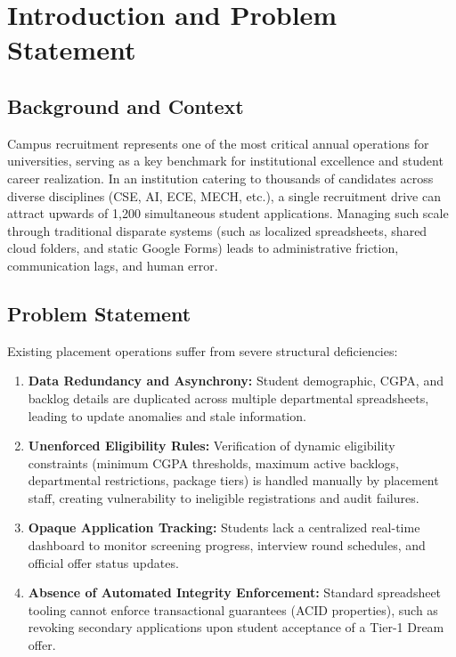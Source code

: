 \documentclass[11pt,a4paper]{article}
\begin{document}
\section{Introduction and Problem Statement}
\label{sec:intro_problem}

\subsection{Background and Context}
Campus recruitment represents one of the most critical annual operations for universities, serving as a key benchmark for institutional excellence and student career realization. In an institution catering to thousands of candidates across diverse disciplines (CSE, AI, ECE, MECH, etc.), a single recruitment drive can attract upwards of 1,200 simultaneous student applications. Managing such scale through traditional disparate systems (such as localized spreadsheets, shared cloud folders, and static Google Forms) leads to administrative friction, communication lags, and human error.

\subsection{Problem Statement}
Existing placement operations suffer from severe structural deficiencies:
\begin{enumerate}[label=\textbf{(\alph*)}]
    \item \textbf{Data Redundancy and Asynchrony:} Student demographic, CGPA, and backlog details are duplicated across multiple departmental spreadsheets, leading to update anomalies and stale information.
    \item \textbf{Unenforced Eligibility Rules:} Verification of dynamic eligibility constraints (minimum CGPA thresholds, maximum active backlogs, departmental restrictions, package tiers) is handled manually by placement staff, creating vulnerability to ineligible registrations and audit failures.
    \item \textbf{Opaque Application Tracking:} Students lack a centralized real-time dashboard to monitor screening progress, interview round schedules, and official offer status updates.
    \item \textbf{Absence of Automated Integrity Enforcement:} Standard spreadsheet tooling cannot enforce transactional guarantees (ACID properties), such as revoking secondary applications upon student acceptance of a Tier-1 Dream offer.
\end{enumerate}
\end{document}

